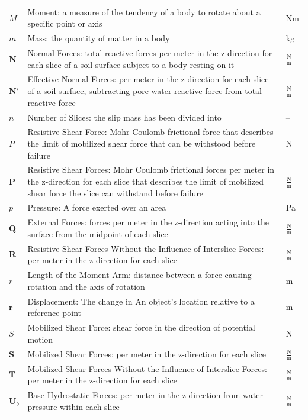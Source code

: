 \documentclass[12pt]{article}
\begin{document}
\begin{longtabu}{l X[l] l}
\\
$M$ & Moment: a measure of the tendency of a body to rotate about a specific point or axis & Nm
\\
$m$ & Mass: the quantity of matter in a body & kg
\\
$\mathbf{N}$ & Normal Forces: total reactive forces per meter in the z-direction for each slice of a soil surface subject to a body resting on it & $\frac{\text{N}}{\text{m}}$
\\
$\mathbf{N'}$ & Effective Normal Forces: per meter in the z-direction for each slice of a soil surface, subtracting pore water reactive force from total reactive force & $\frac{\text{N}}{\text{m}}$
\\
$n$ & Number of Slices: the slip mass has been divided into & --
\\
$P$ & Resistive Shear Force: Mohr Coulomb frictional force that describes the limit of mobilized shear force that can be withstood before failure & N
\\
$\mathbf{P}$ & Resistive Shear Forces: Mohr Coulomb frictional forces per meter in the z-direction for each slice that describes the limit of mobilized shear force the slice can withstand before failure & $\frac{\text{N}}{\text{m}}$
\\
$p$ & Pressure: A force exerted over an area & Pa
\\
$\mathbf{Q}$ & External Forces: forces per meter in the z-direction acting into the surface from the midpoint of each slice & $\frac{\text{N}}{\text{m}}$
\\
$\mathbf{R}$ & Resistive Shear Forces Without the Influence of Interslice Forces: per meter in the z-direction for each slice & $\frac{\text{N}}{\text{m}}$
\\
$r$ & Length of the Moment Arm: distance between a force causing rotation and the axis of rotation & m
\\
$\mathbf{r}$ & Displacement: The change in An object's location relative to a reference point & m
\\
$S$ & Mobilized Shear Force: shear force in the direction of potential motion & N
\\
$\mathbf{S}$ & Mobilized Shear Forces: per meter in the z-direction for each slice & $\frac{\text{N}}{\text{m}}$
\\
$\mathbf{T}$ & Mobilized Shear Forces Without the Influence of Interslice Forces: per meter in the z-direction for each slice & $\frac{\text{N}}{\text{m}}$
\\
${\mathbf{U}_{b}}$ & Base Hydrostatic Forces: per meter in the z-direction from water pressure within each slice & $\frac{\text{N}}{\text{m}}$

\end{longtabu}
\end{document}
